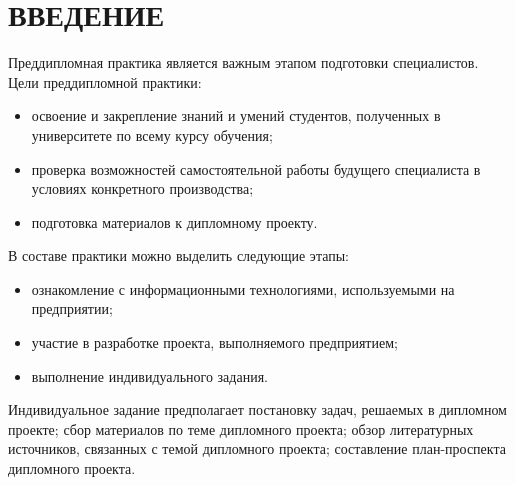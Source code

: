 \section*{ВВЕДЕНИЕ}

Преддипломная практика является важным этапом подготовки специалистов.
Цели преддипломной практики:
\begin{itemize}
\item освоение и закрепление знаний и умений студентов,
  полученных в университете по всему курсу обучения;
\item проверка возможностей самостоятельной работы будущего специалиста
  в условиях конкретного производства;
\item подготовка материалов к дипломному проекту.
\end{itemize}

В составе практики можно выделить следующие этапы:
\begin{itemize}
\item ознакомление с информационными технологиями, используемыми на предприятии;
\item участие в разработке проекта, выполняемого предприятием;
\item выполнение индивидуального задания.
\end{itemize}

Индивидуальное задание предполагает
постановку задач, решаемых в дипломном проекте;
сбор материалов по теме дипломного проекта;
обзор литературных источников, связанных с темой дипломного проекта;
составление план-проспекта дипломного проекта.